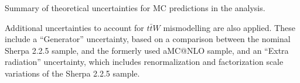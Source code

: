 \begin{table}[H]                                                                                                              {\footnotesize
\centering

\caption{Summary of theoretical uncertainties for MC predictions in the analysis.}
\label{tab:xsecUnc}}
\end{table}

Additional uncertainties to account for $t\bar{t}W$ mismodelling are also applied. These include a ``Generator'' uncertainty, based on a comparison between the nominal Sherpa 2.2.5 sample, and the formerly used aMC@NLO sample, and an ``Extra radiation'' uncertainty, which includes renormalization and factorization scale variations of the Sherpa 2.2.5 sample.
